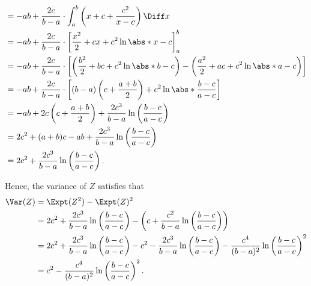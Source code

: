 \begin{enumerate}
\begin{align*}
                         & = -ab + \frac{2c}{b - a} \cdot \int_{a}^{b} \left(x + c + \frac{c^2}{x - c}\right) \Diff x                                                                  \\
                         & = -ab + \frac{2c}{b - a} \cdot \left[\frac{x^2}{2} + cx + c^2 \ln \abs*{x - c}\right]_{a}^{b}                                                               \\
                         & = -ab + \frac{2c}{b - a} \cdot \left[\left(\frac{b^2}{2} + bc + c^2 \ln \abs*{b - c}\right) - \left(\frac{a^2}{2} + ac + c^2 \ln \abs*{a - c}\right)\right] \\
                         & = -ab + \frac{2c}{b - a} \cdot \left[(b - a) \left(c + \frac{a + b}{2}\right) + c^2 \ln \abs*{\frac{b - c}{a - c}}\right]                                   \\
                         & = -ab + 2c \left(c + \frac{a + b}{2}\right) + \frac{2c^3}{b - a} \ln \left(\frac{b - c}{a - c}\right)                                                       \\
                         & = 2c^2 + (a + b)c - ab + \frac{2c^3}{b - a} \ln \left(\frac{b - c}{a - c}\right)                                                                            \\
                         & = 2c^2 + \frac{2c^3}{b - a} \ln \left(\frac{b - c}{a - c}\right).
          \end{align*}

          Hence, the variance of \(Z\) satisfies that
          \begin{align*}
              \Var(Z) & = \Expt(Z^2) - \Expt(Z)^2                                                                                                                                                                       \\
                      & = 2c^2 + \frac{2c^3}{b - a} \ln \left(\frac{b - c}{a - c}\right) - \left(c + \frac{c^2}{b - a} \ln \left(\frac{b - c}{a - c}\right)\right)                                                      \\
                      & = 2c^2 + \frac{2c^3}{b - a} \ln \left(\frac{b - c}{a - c}\right) - c^2 - \frac{2c^3}{b - a} \ln \left(\frac{b - c}{a - c}\right) - \frac{c^4}{(b - a)^2} \ln \left(\frac{b - c}{a - c}\right)^2 \\
                      & = c^2 - \frac{c^4}{(b - a)^2} \ln \left(\frac{b - c}{a - c}\right)^2.
          \end{align*}


\end{enumerate}
